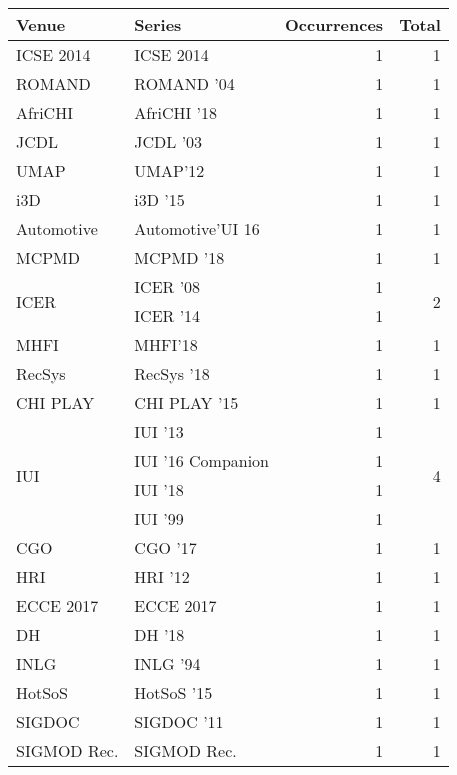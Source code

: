 \begin{table*}[t]
\begin{tabular}{llrr}
Venue & Series & Occurrences & Total\\\hline
\multirow{1}{*}{ICSE 2014} & ICSE 2014 & 1 & \multirow{1}{*}{1}\\
\multirow{1}{*}{ROMAND } & ROMAND '04 & 1 & \multirow{1}{*}{1}\\
\multirow{1}{*}{AfriCHI } & AfriCHI '18 & 1 & \multirow{1}{*}{1}\\
\multirow{1}{*}{JCDL } & JCDL '03 & 1 & \multirow{1}{*}{1}\\
\multirow{1}{*}{UMAP} & UMAP'12 & 1 & \multirow{1}{*}{1}\\
\multirow{1}{*}{i3D } & i3D '15 & 1 & \multirow{1}{*}{1}\\
\multirow{1}{*}{Automotive} & Automotive'UI 16 & 1 & \multirow{1}{*}{1}\\
\multirow{1}{*}{MCPMD } & MCPMD '18 & 1 & \multirow{1}{*}{1}\\
\multirow{2}{*}{ICER } & ICER '08 & 1 & \multirow{2}{*}{2}\\
& ICER '14 & 1 &\\
\multirow{1}{*}{MHFI} & MHFI'18 & 1 & \multirow{1}{*}{1}\\
\multirow{1}{*}{RecSys } & RecSys '18 & 1 & \multirow{1}{*}{1}\\
\multirow{1}{*}{CHI PLAY } & CHI PLAY '15 & 1 & \multirow{1}{*}{1}\\
\multirow{4}{*}{IUI } & IUI '13 & 1 & \multirow{4}{*}{4}\\
& IUI '16 Companion & 1 &\\
& IUI '18 & 1 &\\
& IUI '99 & 1 &\\
\multirow{1}{*}{CGO } & CGO '17 & 1 & \multirow{1}{*}{1}\\
\multirow{1}{*}{HRI } & HRI '12 & 1 & \multirow{1}{*}{1}\\
\multirow{1}{*}{ECCE 2017} & ECCE 2017 & 1 & \multirow{1}{*}{1}\\
\multirow{1}{*}{DH } & DH '18 & 1 & \multirow{1}{*}{1}\\
\multirow{1}{*}{INLG } & INLG '94 & 1 & \multirow{1}{*}{1}\\
\multirow{1}{*}{HotSoS } & HotSoS '15 & 1 & \multirow{1}{*}{1}\\
\multirow{1}{*}{SIGDOC } & SIGDOC '11 & 1 & \multirow{1}{*}{1}\\
\multirow{1}{*}{SIGMOD Rec.} & SIGMOD Rec. & 1 & \multirow{1}{*}{1}\\

\end{tabular}
\end{table*}
